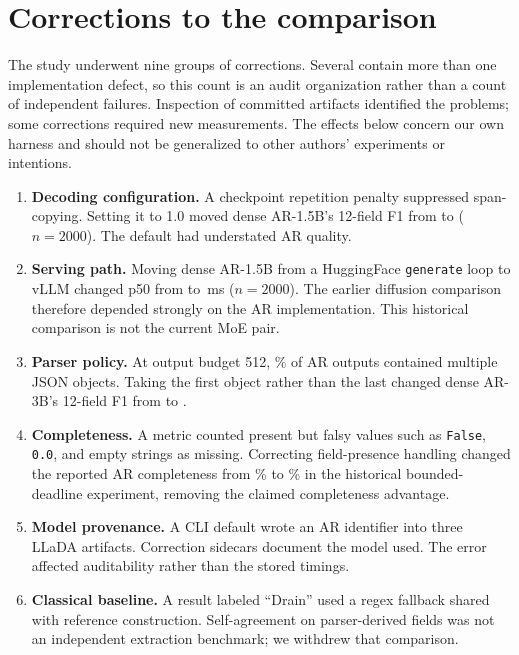 \section{Corrections to the comparison}
\label{app:defects}

The study underwent nine groups of corrections. Several contain more than
one implementation defect, so this count is an audit organization rather
than a count of independent failures. Inspection of committed artifacts
identified the problems; some corrections required new measurements.
The effects below concern our own harness and should not be generalized
to other authors' experiments or intentions.

\begin{enumerate}
\item \textbf{Decoding configuration.} A checkpoint repetition penalty
suppressed span-copying. Setting it to 1.0 moved dense AR-1.5B's
12-field F1 from  to 
($n{=}2000$). The default had understated AR quality.
\item \textbf{Serving path.} Moving dense AR-1.5B from a HuggingFace
\texttt{generate} loop to vLLM changed p50 from
 to \,ms ($n{=}2000$).
The earlier diffusion comparison therefore depended strongly on the AR
implementation. This historical comparison is not the current MoE pair.
\item \textbf{Parser policy.} At output budget 512, \rambleRate\%
of AR outputs contained multiple JSON objects. Taking the first object
rather than the last changed dense AR-3B's 12-field F1 from
 to .
\item \textbf{Completeness.} A metric counted present but falsy values
such as \texttt{False}, \texttt{0.0}, and empty strings as missing.
Correcting field-presence handling changed the reported AR completeness
from \% to \% in the historical
bounded-deadline experiment, removing the claimed completeness advantage.
\item \textbf{Model provenance.} A CLI default wrote an AR identifier
into three LLaDA artifacts. Correction sidecars document the model used.
The error affected auditability rather than the stored timings.
\item \textbf{Classical baseline.} A result labeled ``Drain'' used a
regex fallback shared with reference construction. Self-agreement on
parser-derived fields was not an independent extraction benchmark;
we withdrew that comparison.

\end{enumerate}
